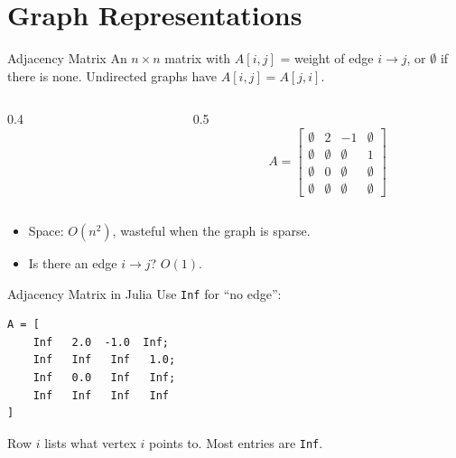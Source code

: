 \documentclass[10pt,aspectratio=169]{beamer}
\begin{document}
\section{Graph Representations}

\begin{frame}{Adjacency Matrix}
  An $n \times n$ matrix with $A[i,j]$ = weight of edge $i \to j$, or
  $\emptyset$ if there is none. Undirected graphs have $A[i,j] = A[j,i]$.

  \bigskip
  \begin{columns}[c]
    \begin{column}{0.4\textwidth}
      \begin{center}
      \end{center}
    \end{column}
    \begin{column}{0.5\textwidth}
      \[
        A = \begin{bmatrix}
          \emptyset & 2 & -1 & \emptyset \\
          \emptyset & \emptyset & \emptyset & 1 \\
          \emptyset & 0 & \emptyset & \emptyset \\
          \emptyset & \emptyset & \emptyset & \emptyset
        \end{bmatrix}
      \]
    \end{column}
  \end{columns}

  \bigskip
  \pause
  \begin{itemize}
    \item Space: $O(n^2)$, wasteful when the graph is \alert{sparse}.
    \item Is there an edge $i \to j$? $O(1)$.
  \end{itemize}
\end{frame}

\begin{frame}[fragile]{Adjacency Matrix in Julia}
  Use \texttt{Inf} for ``no edge'':

  \bigskip
\begin{lstlisting}
A = [
    Inf   2.0  -1.0  Inf;
    Inf   Inf   Inf   1.0;
    Inf   0.0   Inf   Inf;
    Inf   Inf   Inf   Inf
]
\end{lstlisting}

  \bigskip
  \begin{center}
    Row $i$ lists what vertex $i$ points to. Most entries are \texttt{Inf}.
  \end{center}
\end{frame}
\end{document}
